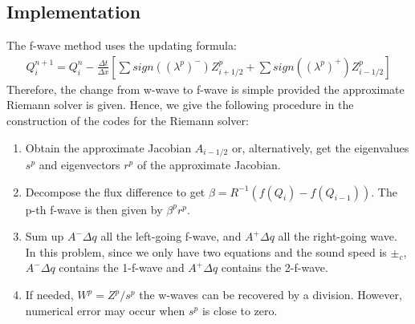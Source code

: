 \documentclass{article}
\begin{document}
\subsection{Implementation}
The f-wave method uses the updating formula:
\begin{align}
Q_i^{n+1}=Q_i^{n}-\frac{\Delta t}{\Delta x}\left[\sum sign((\lambda^p)^-) Z_{i+1/2}^p+\sum sign((\lambda^p)^+) Z_{i-1/2}^p\right]
\end{align}
Therefore, the change from w-wave to f-wave is simple provided the approximate Riemann solver is given. Hence, we give the following procedure in the construction of the codes for the Riemann solver:
\begin{enumerate}
\item Obtain the approximate Jacobian $A_{i-1/2}$ or, alternatively, get the eigenvalues $s^p$ and eigenvectors $r^p$ of the approximate Jacobian.
\item Decompose the flux difference to get $\beta=R^{-1}(f(Q_i)-f(Q_{i-1}))$. The p-th f-wave is then given by $\beta^p r^p$.
\item Sum up $A^- \Delta q$ all the left-going f-wave, and $A^+ \Delta q$ all the right-going wave. In this problem, since we only have two equations and the sound speed is $\pm_c$, $A^- \Delta q$ contains the 1-f-wave and $A^+ \Delta q$ contains the 2-f-wave.
\item If needed, $W^p=Z^p/s^p$ the w-waves can be recovered by a division. However, numerical error may occur when $s^p$ is close to zero. 
\end{enumerate}
\end{document}
